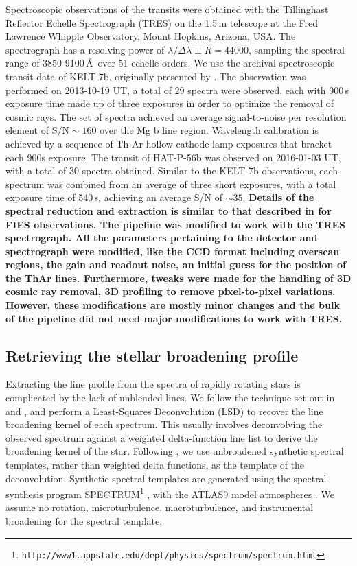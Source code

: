 \documentclass[useAMS,usenatbib]{mn2e}
\begin{document}
Spectroscopic observations of the transits were obtained with the Tillinghast Reflector Echelle Spectrograph (TRES) on the 1.5\,m telescope at the Fred Lawrence Whipple Observatory, Mount Hopkins, Arizona, USA. The spectrograph has a resolving power of $\lambda / \Delta \lambda \equiv R = 44000$, sampling the spectral range of 3850-9100\,\AA\, over 51 echelle orders. We use the archival spectroscopic transit data of KELT-7b, originally presented by \citet{2015AJ....150...12B}. The observation was performed on 2013-10-19 UT, a total of 29 spectra were observed, each with 900\,s exposure time made up of three exposures in order to optimize the removal of cosmic rays. The set of spectra achieved an average signal-to-noise per resolution element of $\text{S/N} \sim 160$ over the Mg b line region. Wavelength calibration is achieved by a sequence of Th-Ar hollow cathode lamp exposures that bracket each 900s exposure. The transit of HAT-P-56b was observed on 2016-01-03 UT, with a total of 30 spectra obtained. Similar to the KELT-7b observations, each spectrum was combined from an average of three short exposures, with a total exposure time of 540\,s, achieving an average S/N of $\sim35$. \textbf{Details of the spectral reduction and extraction is similar to that described in \citet{2010ApJ...720.1118B} for FIES observations. The pipeline was modified to work with the TRES spectrograph. All the parameters pertaining to the detector and spectrograph were modified, like the CCD format including overscan regions, the gain and readout noise, an initial guess for the position of the ThAr lines. Furthermore, tweaks were made for the handling of 3D cosmic ray removal, 3D profiling to remove pixel-to-pixel variations. However, these modifications are mostly minor changes and the bulk of the pipeline did not need major modifications to work with TRES.}

\subsection{Retrieving the stellar broadening profile}
\label{sec:lsd}

Extracting the line profile from the spectra of rapidly rotating stars is complicated by the lack of unblended lines. We follow the technique set out in \citet{1997MNRAS.291..658D} and \citet{2010MNRAS.407..507C}, and perform a Least-Squares Deconvolution (LSD) to recover the line broadening kernel of each spectrum. This usually involves deconvolving the observed spectrum against a weighted delta-function line list to derive the broadening kernel of the star. Following \citet{2015AJ....150..197H}, we use unbroadened synthetic spectral templates, rather than weighted delta functions, as the template of the deconvolution. Synthetic spectral templates are generated using the spectral synthesis program SPECTRUM\footnote{\texttt{http://www1.appstate.edu/dept/physics/spectrum/spectrum.html}} \citep{1994AJ....107..742G}, with the ATLAS9 model atmospheres \citep{2004astro.ph..5087C}. We assume no rotation, microturbulence, macroturbulence, and instrumental broadening for the spectral template. 
\end{document}
